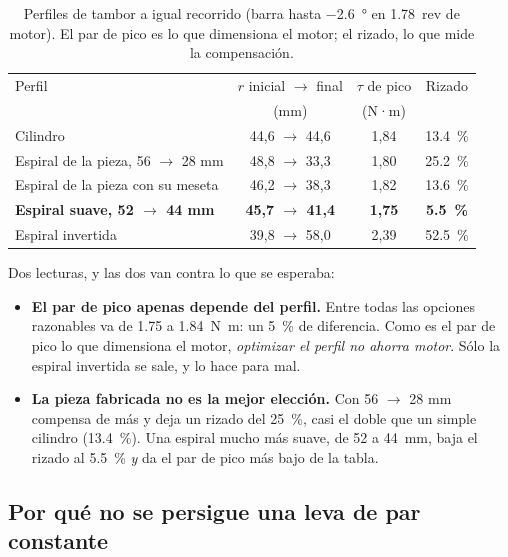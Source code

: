 \begin{table}[H]
\centering
\caption{Perfiles de tambor a igual recorrido (barra hasta \SI{-2.6}{\degree} en \SI{1.78}{rev} de
motor). El par de pico es lo que dimensiona el motor; el rizado, lo que mide la compensación.}
\label{tab:perfiles}
\begin{tabular}{@{}lccc@{}}
\toprule
Perfil & $r$ inicial $\to$ final & $\tau$ de pico & Rizado \\
       & (mm) & (N·m) & \\
\midrule
Cilindro & 44,6 $\to$ 44,6 & 1,84 & \SI{13.4}{\percent} \\
Espiral de la pieza, 56 $\to$ 28 mm & 48,8 $\to$ 33,3 & 1,80 & \SI{25.2}{\percent} \\
Espiral de la pieza con su meseta & 46,2 $\to$ 38,3 & 1,82 & \SI{13.6}{\percent} \\
\textbf{Espiral suave, 52 $\to$ 44 mm} & \textbf{45,7 $\to$ 41,4} & \textbf{1,75} & \textbf{\SI{5.5}{\percent}} \\
Espiral invertida & 39,8 $\to$ 58,0 & 2,39 & \SI{52.5}{\percent} \\
\bottomrule
\end{tabular}
\end{table}

Dos lecturas, y las dos van contra lo que se esperaba:

\begin{itemize}
  \item \textbf{El par de pico apenas depende del perfil.} Entre todas las opciones razonables va de
        \num{1.75} a \SI{1.84}{\newton\metre}: un \SI{5}{\percent} de diferencia. Como es el par de
        pico lo que dimensiona el motor, \emph{optimizar el perfil no ahorra motor}. Sólo la espiral
        invertida se sale, y lo hace para mal.
  \item \textbf{La pieza fabricada no es la mejor elección.} Con 56 $\to$ 28 mm compensa de más y
        deja un rizado del \SI{25}{\percent}, casi el doble que un simple cilindro
        (\SI{13.4}{\percent}). Una espiral mucho más suave, de 52 a \SI{44}{\milli\metre}, baja el
        rizado al \SI{5.5}{\percent} \emph{y} da el par de pico más bajo de la tabla.
\end{itemize}

\subsection{Por qué no se persigue una leva de par constante}

